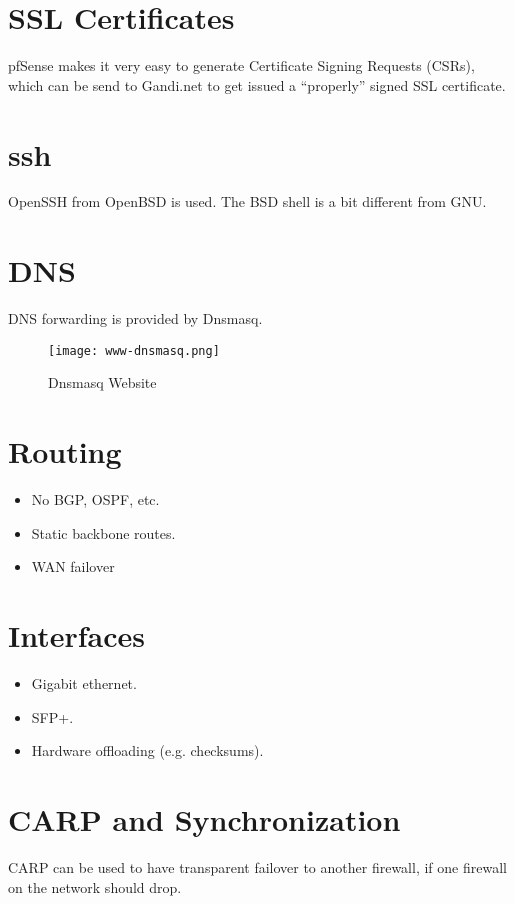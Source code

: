 \section{SSL Certificates}
pfSense makes it very easy to generate Certificate Signing Requests (CSRs),
which can be send to Gandi.net to get issued a ``properly'' signed SSL
certificate.


\section{ssh}
OpenSSH from OpenBSD is used. The BSD shell is a bit different from GNU.


\section{DNS}
DNS forwarding is provided by Dnsmasq.

\begin{figure}[h!]
\texttt{[image: www-dnsmasq.png]}
 \caption{Dnsmasq Website}
 \label{fig:www-dnsmasq}
\end{figure}



\section{Routing}
\begin{itemize}
 \item No BGP, OSPF, etc.
 \item Static backbone routes.
 \item WAN failover
\end{itemize}


\section{Interfaces}

\begin{itemize}
 \item Gigabit ethernet.
 \item SFP+.
 \item Hardware offloading (e.g. checksums).
\end{itemize}


\section{CARP and Synchronization}
CARP can be used to have transparent failover to another firewall, if one
firewall on the network should drop.

